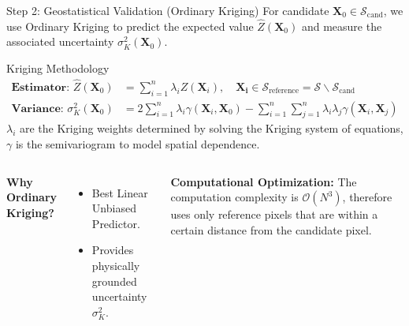 \documentclass[10pt, aspectratio=169]{beamer}
\begin{document}
\begin{frame}{Step 2: Geostatistical Validation (Ordinary Kriging)}
    For candidate $\mathbf{X}_0 \in \mathcal{S}_{\text{cand}}$, we use Ordinary Kriging to predict the expected value $\hat{Z}(\mathbf{X}_0)$ and measure the associated uncertainty $\sigma^2_K(\mathbf{X}_0)$.
    \begin{block}{Kriging Methodology}
        \begin{align}
            \textbf{Estimator: } \hat{Z}(\mathbf{X}_0)   & = \sum_{i=1}^{n} \lambda_i Z(\mathbf{X}_i), \quad \mathbf{X_i} \in \mathcal{S}_{\text{reference}} = \mathcal{S} \backslash \mathcal{S}_{\text{cand}}   \\
            \textbf{Variance: } \sigma^2_K(\mathbf{X}_0) & = 2 \sum_{i=1}^{n} \lambda_i \gamma(\mathbf{X}_i, \mathbf{X}_0) - \sum_{i=1}^{n} \sum_{j=1}^{n} \lambda_i \lambda_j \gamma(\mathbf{X}_i, \mathbf{X}_j)
        \end{align}
        $\lambda_i$ are the Kriging weights determined by solving the Kriging system of equations, $\gamma$ is the semivariogram to model spatial dependence.
    \end{block}

    \begin{columns}[T]
        \textbf{Why Ordinary Kriging?}
        \begin{itemize}
            \item Best Linear Unbiased Predictor.
            \item Provides \alert{physically grounded uncertainty} $\sigma^2_K$.
        \end{itemize}

        \textbf{Computational Optimization:}
        The computation complexity is \alert{$\mathcal{O}(N^3)$}, therefore uses only reference pixels that are within a certain distance from the candidate pixel.
    \end{columns}
\end{frame}
\end{document}
